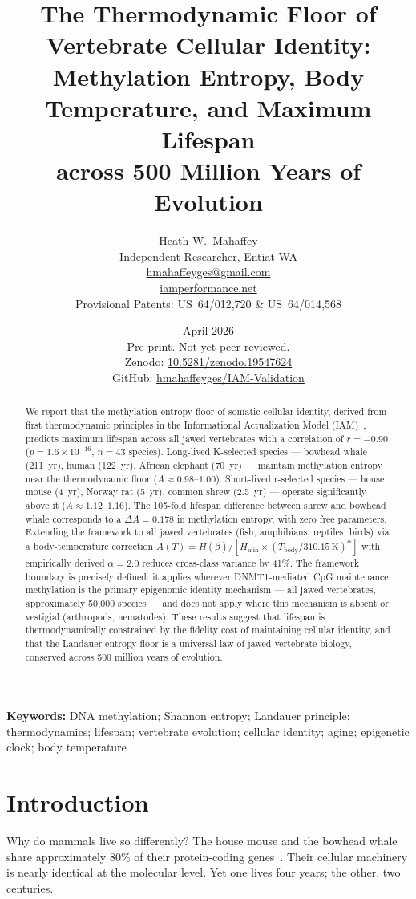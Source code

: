 \documentclass[11pt,a4paper]{article}
\title{The Thermodynamic Floor of Vertebrate Cellular Identity:\\
Methylation Entropy, Body Temperature, and Maximum Lifespan\\
across 500 Million Years of Evolution}
\author{Heath W.\ Mahaffey\\
\small Independent Researcher, Entiat WA\\
\small \href{mailto:hmahaffeyges@gmail.com}{hmahaffeyges@gmail.com}\\
\small \href{https://iamperformance.net}{iamperformance.net}\\[4pt]
\small Provisional Patents: US~64/012,720 \& US~64/014,568}
\date{April 2026\\[4pt]
\small Pre-print. Not yet peer-reviewed.\\
\small Zenodo: \href{https://doi.org/10.5281/zenodo.19547624}{10.5281/zenodo.19547624}\\
\small GitHub: \href{https://github.com/hmahaffeyges/IAM-Validation}{hmahaffeyges/IAM-Validation}}
\newcommand{\Hmin}{H_{\min}}
\newcommand{\Ascore}{A}
\begin{document}
\maketitle

\begin{abstract}
We report that the methylation entropy floor of somatic cellular identity,
derived from first thermodynamic principles in the Informational Actualization
Model (IAM)~\citep{Mahaffey2026}, predicts maximum lifespan across all jawed
vertebrates with a correlation of $r = -0.90$ ($p = 1.6 \times 10^{-16}$, $n = 43$
species). Long-lived K-selected species --- bowhead whale (211~yr), human (122~yr),
African elephant (70~yr) --- maintain methylation entropy near the thermodynamic
floor ($\Ascore \approx 0.98$--$1.00$). Short-lived r-selected species --- house mouse
(4~yr), Norway rat (5~yr), common shrew (2.5~yr) --- operate significantly above it
($\Ascore \approx 1.12$--$1.16$). The 105-fold lifespan difference between shrew and
bowhead whale corresponds to a $\Delta\Ascore = 0.178$ in methylation entropy,
with zero free parameters. Extending the framework to all jawed vertebrates
(fish, amphibians, reptiles, birds) via a body-temperature correction
$A(T) = H(\beta) / [\Hmin \times (T_{\mathrm{body}}/310.15\,\mathrm{K})^{\alpha}]$
with empirically derived $\alpha = 2.0$ reduces cross-class variance by 41\%.
The framework boundary is precisely defined: it applies wherever DNMT1-mediated
CpG maintenance methylation is the primary epigenomic identity mechanism ---
all jawed vertebrates, approximately 50,000 species --- and does not apply
where this mechanism is absent or vestigial (arthropods, nematodes). These
results suggest that lifespan is thermodynamically constrained by the fidelity
cost of maintaining cellular identity, and that the Landauer entropy floor is a
universal law of jawed vertebrate biology, conserved across 500 million years
of evolution.
\end{abstract}

\textbf{Keywords:} DNA methylation; Shannon entropy; Landauer principle;
thermodynamics; lifespan; vertebrate evolution; cellular identity; aging;
epigenetic clock; body temperature

\section{Introduction}

Why do mammals live so differently? The house mouse and the bowhead whale share
approximately 80\% of their protein-coding genes~\citep{Waterston2002}. Their
cellular machinery is nearly identical at the molecular level. Yet one lives
four years; the other, two centuries.
\end{document}
